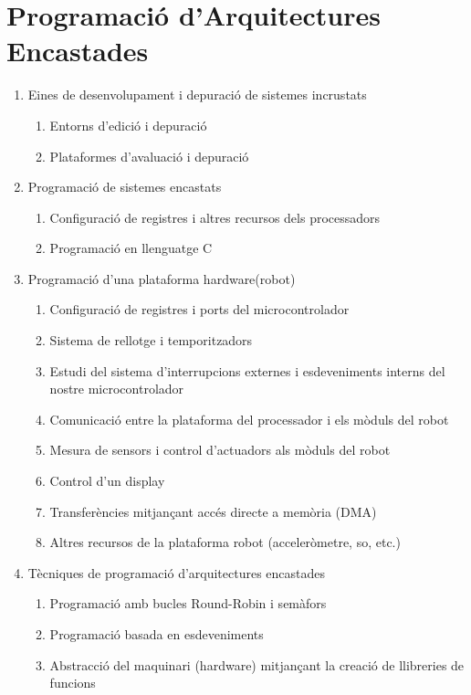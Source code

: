 \documentclass{article}
\begin{document}
\section{Programació d'Arquitectures Encastades}
\begin{enumerate}
\item Eines de desenvolupament i depuració de sistemes incrustats
	\begin{enumerate}
	\item Entorns d’edició i depuració
	\item Plataformes d’avaluació i depuració
	\end{enumerate}
\item Programació de sistemes encastats
	\begin{enumerate}
	\item Configuració de registres i altres recursos dels processadors
	\item Programació en llenguatge C
	\end{enumerate}
\item Programació d’una plataforma \guillemotleft hardware\guillemotright (robot)%
	\begin{enumerate}
	\item Configuració de registres i ports del microcontrolador
	\item Sistema de rellotge i temporitzadors
	\item Estudi del sistema d’interrupcions externes i esdeveniments interns del nostre microcontrolador
	\item Comunicació entre la plataforma del processador i els mòduls del robot
	\item Mesura de sensors i control d’actuadors als mòduls del robot
	\item Control d’un display
	\item Transferències mitjançant accés directe a memòria (DMA)
	\item Altres recursos de la plataforma robot (acceleròmetre, so, etc.)
	\end{enumerate}
\item Tècniques de programació d’arquitectures encastades
	\begin{enumerate}
	\item Programació amb bucles Round-Robin i semàfors
	\item Programació basada en esdeveniments
	\item Abstracció del maquinari (hardware) mitjançant la creació de llibreries de funcions
	\end{enumerate}
\end{enumerate}
\newpage
\end{document}
